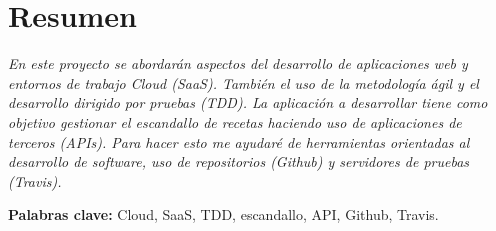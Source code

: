 \documentclass[a4paper,openright,14pt]{book}
\begin{document}
\chapter*{Resumen}

\emph{En este proyecto se abordarán aspectos del desarrollo de aplicaciones web y entornos de trabajo Cloud (SaaS). También el uso de la metodología ágil y el desarrollo dirigido por pruebas (TDD). La aplicación a desarrollar tiene como objetivo gestionar el escandallo de recetas haciendo uso de aplicaciones de terceros (APIs). Para hacer esto me ayudaré de herramientas orientadas al desarrollo de software, uso de repositorios (Github) y servidores de pruebas (Travis).}

\vspace*{0.2in}
\textbf{Palabras clave:} Cloud, SaaS, TDD, escandallo, API, Github, Travis.
\end{document}
